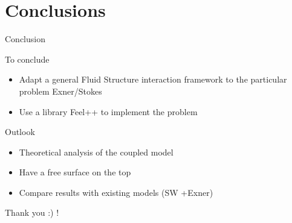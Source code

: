 \documentclass[notes]{beamer}
\begin{document}
\section{Conclusions}
\begin{frame}{Conclusion}

\begin{block}{To conclude}
\begin{itemize}
\item Adapt a general Fluid Structure interaction framework to the particular problem Exner/Stokes
\item Use a library Feel++ to implement the problem
\end{itemize}
\end{block}

\begin{block}{Outlook}
\begin{itemize}
\item Theoretical analysis of the coupled model 
\item Have a free surface on the top
\item Compare results with existing models (SW +Exner)
\end{itemize}
\end{block}


\end{frame}

\begin{frame}
  \centering
        Thank you  :) !  
\end{frame}
\end{document}
